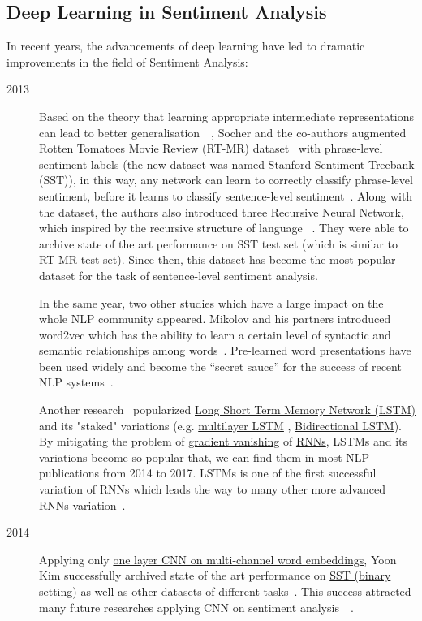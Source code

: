 \subsection{Deep Learning in Sentiment Analysis}
In recent years, the advancements of deep learning have led to dramatic improvements in the field of Sentiment Analysis:
\begin{description}
\item [2013] Based on the theory that learning appropriate intermediate representations can lead to better generalisation~\cite{knowledge-matter}~\cite{tran-auto-encoder}, Socher and the co-authors augmented Rotten Tomatoes Movie Review  (RT-MR) dataset~\cite{Rotten-Tomato} with phrase-level sentiment labels (the new dataset was named \hyperref[sec:sst]{Stanford Sentiment Treebank} (SST)), in this way, any network can learn to correctly classify phrase-level sentiment, before it learns to classify sentence-level sentiment~\cite{socher2013recursive}. Along with the dataset, the authors also introduced three Recursive Neural Network, which inspired by the recursive structure of language ~\cite{socher2013recursive}.
They were able to archive state of the art performance on SST test set (which is similar to RT-MR test set).
Since then, this dataset has become the most popular dataset for the task of sentence-level sentiment analysis.

In the same year, two other studies which have a large impact on the whole NLP community appeared.
Mikolov and his partners introduced word2vec which has the ability to learn a certain level of syntactic and semantic relationships among words~\cite{word2vec}.
Pre-learned word presentations have been used widely and become the “secret sauce” for the success of recent NLP systems~\cite{Luong_betterword}.

Another research~\cite{GravesLSTM} popularized \hyperref[sec:lstm]{Long Short Term Memory Network (LSTM)} and its "staked" variations (e.g. \hyperref[sec:multilayer-lstm]{multilayer LSTM} , \hyperref[sec:bilstm]{Bidirectional LSTM}).
By mitigating the problem of \hyperref[sec:gradient-vanish]{gradient vanishing} of \hyperref[sec:RNN]{RNNs}, LSTMs and its variations become so popular that, we can find them in most NLP publications from 2014 to 2017.
LSTMs is one of the first successful variation of RNNs which leads the way to many other more advanced RNNs variation~\cite{olah2016attention}.

\item [2014] Applying only \hyperref[kim-cnn]{one layer CNN on multi-channel word embeddings}, Yoon Kim successfully archived state of the art performance on \hyperref[sec:sst]{SST (binary setting)} as well as other datasets of different tasks~\cite{KimCNN}.
This success attracted many future researches applying CNN on sentiment analysis~\cite{2-layer-cnn}~\cite{cnn-rnn}.


\end{description}
